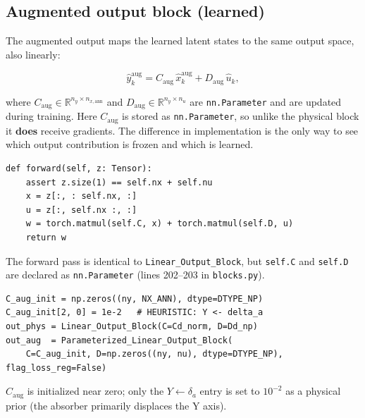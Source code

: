 \documentclass[11pt,a4paper]{article}
\newcommand{\file}[1]{\texttt{\small #1}}
\newcommand{\code}[1]{\texttt{#1}}
\newcommand{\codetitle}[2]{\small\texttt{#1}\quad lines #2}
\begin{document}
\subsection{Augmented output block (learned)}

The augmented output maps the learned latent states to the same output
space, also linearly:

\begin{equation}
  \hat{y}_k^{\mathrm{aug}} = C_{\mathrm{aug}}\, \hat{x}_k^{\mathrm{aug}}
                            + D_{\mathrm{aug}}\, \hat{u}_k,
  \label{eq:y_aug}
\end{equation}

where $C_{\mathrm{aug}} \in \mathbb{R}^{n_y \times n_{x,\mathrm{ann}}}$
and $D_{\mathrm{aug}} \in \mathbb{R}^{n_y \times n_u}$ are
\code{nn.Parameter} and are updated during training.
Here $C_{\mathrm{aug}}$ is stored as \code{nn.Parameter}, so unlike the
physical block it \textbf{does} receive gradients.
The difference in implementation is the only way to see which output
contribution is frozen and which is learned.

\begin{lstlisting}[style=py,
  title={\codetitle{model\_augmentation/fit\_systems/blocks.py}{213--218} -- \texttt{Parameterized\_Linear\_Output\_Block.forward()}},
  firstnumber=213]
def forward(self, z: Tensor):
    assert z.size(1) == self.nx + self.nu
    x = z[:, : self.nx, :]
    u = z[:, self.nx :, :]
    w = torch.matmul(self.C, x) + torch.matmul(self.D, u)
    return w
\end{lstlisting}

The forward pass is identical to \code{Linear\_Output\_Block}, but
\code{self.C} and \code{self.D} are declared as \code{nn.Parameter}
(lines 202--203 in \file{blocks.py}).

\begin{lstlisting}[style=py,
  title={\codetitle{gantry\_interconnect\_dynamic.py}{241--245}},
  firstnumber=241]
C_aug_init = np.zeros((ny, NX_ANN), dtype=DTYPE_NP)
C_aug_init[2, 0] = 1e-2   # HEURISTIC: Y <- delta_a
out_phys = Linear_Output_Block(C=Cd_norm, D=Dd_np)
out_aug  = Parameterized_Linear_Output_Block(
    C=C_aug_init, D=np.zeros((ny, nu), dtype=DTYPE_NP), flag_loss_reg=False)
\end{lstlisting}

$C_{\mathrm{aug}}$ is initialized near zero; only the $Y \leftarrow \delta_a$
entry is set to $10^{-2}$ as a physical prior (the absorber primarily displaces
the Y axis).
\end{document}
